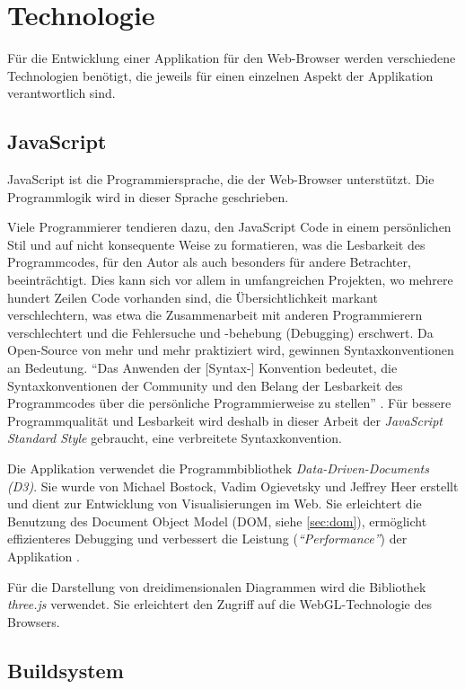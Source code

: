 \section{Technologie}

Für die Entwicklung einer Applikation für den Web-Browser werden verschiedene Technologien benötigt, die jeweils für einen einzelnen Aspekt der Applikation verantwortlich sind.

\subsection{JavaScript}

JavaScript ist die Programmiersprache, die der Web-Browser unterstützt. Die Programmlogik wird in dieser Sprache geschrieben.

Viele Programmierer tendieren dazu, den JavaScript Code in einem persönlichen Stil und auf nicht konsequente Weise zu formatieren, was die Lesbarkeit des Programmcodes, für den Autor als auch besonders für andere Betrachter, beeinträchtigt. Dies kann sich vor allem in umfangreichen Projekten, wo mehrere hundert Zeilen Code vorhanden sind, die Übersichtlichkeit markant verschlechtern, was etwa die Zusammenarbeit mit anderen Programmierern verschlechtert und die Fehlersuche und -behebung (Debugging) erschwert. Da Open-Source von mehr und mehr praktiziert wird, gewinnen Syntaxkonventionen an Bedeutung. "`Das Anwenden der [Syntax-] Konvention bedeutet, die Syntaxkonventionen der Community und den Belang der Lesbarkeit des Programmcodes über die persönliche Programmierweise zu stellen"' \cite{feross}. Für bessere Programmqualität und Lesbarkeit wird deshalb in dieser Arbeit der \textit{JavaScript Standard Style} gebraucht, eine verbreitete Syntaxkonvention.

Die Applikation verwendet die Programmbibliothek \textit{Data-Driven-Documents (D3)}. Sie wurde von Michael Bostock, Vadim Ogievetsky und Jeffrey Heer erstellt und dient zur Entwicklung von Visualisierungen im Web. Sie erleichtert die Benutzung des Document Object Model (DOM, siehe \ref{sec:dom}), ermöglicht effizienteres Debugging und verbessert die Leistung (\textit{"`Performance"'}) der Applikation \cite{bostock}.

Für die Darstellung von dreidimensionalen Diagrammen wird die Bibliothek \textit{three.js} \cite{threejs} verwendet. Sie erleichtert den Zugriff auf die WebGL-Technologie des Browsers.

\subsection{Buildsystem}

